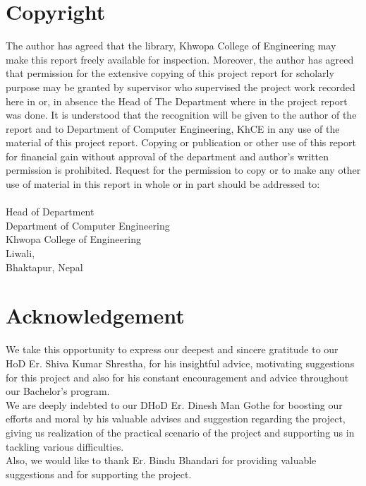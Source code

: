 			\chapter*{Copyright}
		\normalsize
			The author has agreed that the library, Khwopa College of Engineering  may make this report freely available for inspection. Moreover, the author has agreed that permission for the extensive copying of this project report for scholarly purpose may be granted by supervisor who supervised the project work recorded here in or, in absence the Head of The Department where in the project report was done. It is understood that the recognition will be given to the author of the report and to Department of Computer Engineering, KhCE in any use of the material of this project report. Copying or publication or other use of this report for financial gain without approval of the department and author’s written permission is prohibited. Request for the permission to copy or to make any other use of material in this report in whole or in part should be addressed to: \\
			\vspace{1cm} \\
			Head of Department \\
			Department of Computer Engineering\\
			Khwopa College of Engineering\\
			Liwali,\\
			Bhaktapur, Nepal\\
		\break

	
		\large
			\chapter*{Acknowledgement}
		\normalsize
			We take this opportunity to express our deepest and sincere gratitude to our HoD Er. Shiva Kumar Shrestha, for his insightful advice, motivating suggestions for this project and also for his constant encouragement and advice throughout our Bachelor’s program.
			\\We are deeply indebted to our DHoD Er. Dinesh Man Gothe for boosting our efforts and moral by his valuable advises and suggestion regarding the project, giving us realization of the practical scenario of the project and supporting us in tackling various difficulties.\\Also, we would like to thank Er. Bindu Bhandari for providing valuable suggestions and for supporting the project.
			\vspace{1cm}

